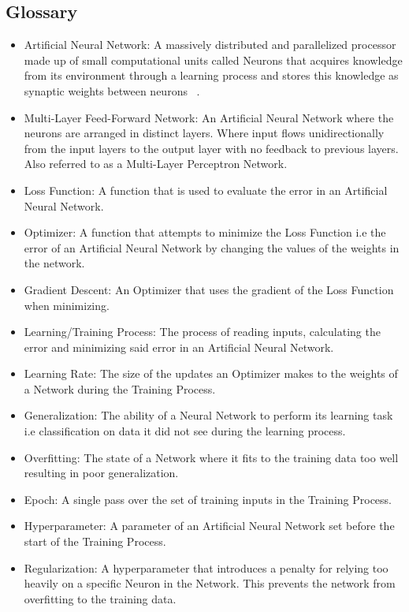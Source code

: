 \documentclass{article}
\begin{document}
\subsection{Glossary}
\begin{itemize}
	\item Artificial Neural Network: A massively distributed and parallelized processor made up of small computational units called Neurons that acquires knowledge from its environment through a learning process and stores this knowledge as synaptic weights between neurons ~\cite{ANNDefinition}.
	\item Multi-Layer Feed-Forward Network: An Artificial Neural Network where the neurons are arranged in distinct layers. Where input flows unidirectionally from the input layers to the output layer with no feedback to previous layers. Also referred to as a Multi-Layer Perceptron Network.  
	\item Loss Function: A function that is used to evaluate the error in an Artificial Neural Network. 
	\item Optimizer: A function that attempts to minimize the Loss Function i.e the error of an Artificial Neural Network by changing the values of the weights in the network.
	\item Gradient Descent: An Optimizer that uses the gradient of the Loss Function when minimizing.
	\item Learning/Training Process: The process of reading inputs, calculating the error and minimizing said error in an Artificial Neural Network. 
	\item Learning Rate: The size of the updates an Optimizer makes to the weights of a Network during the Training Process.
	\item Generalization: The ability of a Neural Network to perform its learning task i.e classification on data it did not see during the learning process. 
	\item Overfitting: The state of a Network where it fits to the training data too well resulting in poor generalization.
	\item Epoch: A single pass over the set of training inputs in the Training Process.
	\item Hyperparameter: A parameter of an Artificial Neural Network set before the start of the Training Process.
	\item Regularization: A hyperparameter that introduces a penalty for relying too heavily on a specific Neuron in the Network. This prevents the network from overfitting to the training data.

\end{itemize}
\end{document}
